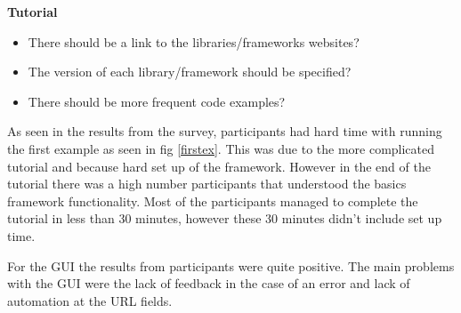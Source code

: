 \textbf{Tutorial}
\begin{itemize}
\item There should be a link to the libraries/frameworks websites?
\item The version of each library/framework should be specified?
\item There should be more frequent code examples?
\end{itemize}

As seen in the results from the survey, participants had hard time with running the first example as seen in fig \ref{firstex}. This was due to the more complicated tutorial
and because hard set up of the framework. However
in the end of the tutorial there was a high number participants that understood the basics framework functionality. Most of the participants managed to complete the tutorial
in less than 30 minutes, however these 30 minutes didn't include set up time.

For the GUI the results from participants were quite positive. The main problems with the GUI were the lack of feedback in the case of an error and lack of automation
at the URL fields.